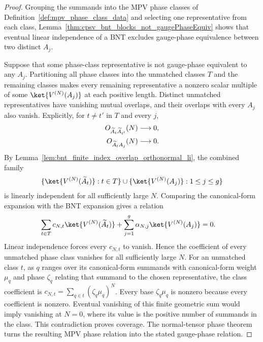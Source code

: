 \begin{proof}\leanok
    Grouping the summands into the MPV phase classes of
    Definition~\ref{def:mpv_phase_class_data} and selecting one representative
    from each class,
    Lemma~\ref{thm:cpsv_bnt_blocks_not_gaugePhaseEquiv} shows that eventual
    linear independence of a BNT excludes gauge-phase equivalence between two
    distinct $A_j$.

    Suppose that some phase-class representative is not gauge-phase equivalent
    to any $A_j$. Partitioning all phase classes into the unmatched classes $T$
    and the remaining classes makes every remaining representative a nonzero
    scalar multiple of some $\ket{V^{(N)}(A_j)}$ at each positive length.
    Distinct unmatched representatives have vanishing mutual overlaps, and
    their overlaps with every $A_j$ also vanish. Explicitly, for $t\ne t'$ in
    $T$ and every $j$,
    \begin{align}
        O_{\widetilde A_t\widetilde A_{t'}}(N) & \longrightarrow0,
        \notag                                                     \\
        O_{\widetilde A_t A_j}(N)              & \longrightarrow0.
        \notag
    \end{align}
    By Lemma~\ref{lem:bnt_finite_index_overlap_orthonormal_li}, the combined
    family
    \begin{align}
        \{\ket{V^{(N)}(\widetilde A_t)}:t\in T\}
        \cup \{\ket{V^{(N)}(A_j)}:1\leq j\leq g\}
        \notag
    \end{align}
    is linearly independent for all sufficiently large $N$. Comparing the
    canonical-form expansion with the BNT expansion gives a relation
    \begin{align}
        \sum_{t\in T}c_{N,t}\ket{V^{(N)}(\widetilde A_t)}
        +\sum_{j=1}^{g}\alpha_{N,j}\ket{V^{(N)}(A_j)}
         & =0.
        \notag
    \end{align}
    Linear independence forces every $c_{N,t}$ to vanish. Hence the
    coefficient of every unmatched phase class vanishes for all sufficiently
    large $N$.
    For an unmatched class $t$, as $q$ ranges over its canonical-form
    summands with canonical-form weight $\mu_q$ and phase $\zeta_q$ relating
    that summand to the chosen representative, the class coefficient is
    $c_{N,t}=\sum_{q\in t}(\zeta_q\mu_q)^N$.
    Every base $\zeta_q\mu_q$ is nonzero because every coefficient is nonzero.
    Eventual vanishing of this finite geometric sum would imply vanishing at
    $N=0$, where its value is the positive number of summands in the class.
    This contradiction proves coverage. The normal-tensor phase theorem turns
    the resulting MPV phase relation into the stated gauge-phase relation.


\end{proof}
